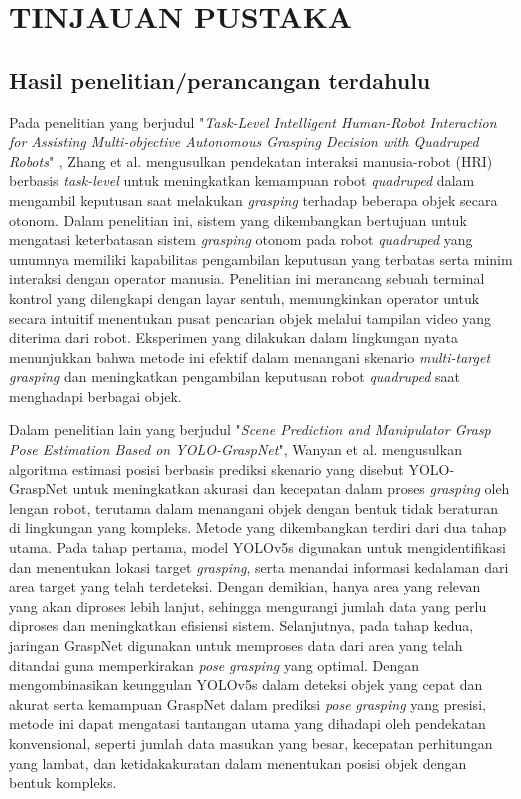 \chapter{TINJAUAN PUSTAKA}

\section{Hasil penelitian/perancangan terdahulu}

Pada penelitian yang berjudul "\emph{Task-Level Intelligent Human-Robot Interaction
for Assisting Multi-objective Autonomous Grasping Decision with Quadruped Robots}"
\parencite{QifanZhang_tlihrifamoagdwqr}, Zhang et al. mengusulkan pendekatan
interaksi manusia-robot (HRI) berbasis \emph{task-level} untuk meningkatkan kemampuan robot \emph{quadruped}
dalam mengambil keputusan saat melakukan \emph{grasping} terhadap beberapa objek secara otonom.
Dalam penelitian ini, sistem yang dikembangkan bertujuan untuk mengatasi keterbatasan sistem
\emph{grasping} otonom pada robot \emph{quadruped} yang umumnya memiliki kapabilitas pengambilan keputusan
yang terbatas serta minim interaksi dengan operator manusia. Penelitian ini merancang sebuah terminal kontrol
yang dilengkapi dengan layar sentuh, memungkinkan operator untuk secara intuitif menentukan
pusat pencarian objek melalui tampilan video yang diterima dari robot.
Eksperimen yang dilakukan dalam lingkungan nyata menunjukkan bahwa metode ini efektif dalam
menangani skenario \emph{multi-target} \emph{grasping} dan meningkatkan pengambilan keputusan robot \emph{quadruped}
saat menghadapi berbagai objek.

Dalam penelitian lain yang berjudul "\emph{Scene Prediction and Manipulator Grasp Pose
Estimation Based on YOLO-GraspNet}"\parencite{LiWanyan_spamgpeboyg}, Wanyan et al. mengusulkan
algoritma estimasi posisi berbasis prediksi skenario yang disebut YOLO-GraspNet untuk
meningkatkan akurasi dan kecepatan dalam proses \emph{grasping} oleh lengan robot, terutama dalam
menangani objek dengan bentuk tidak beraturan di lingkungan yang kompleks.
Metode yang dikembangkan terdiri dari dua tahap utama. Pada tahap pertama, model YOLOv5s
digunakan untuk mengidentifikasi dan menentukan lokasi target \emph{grasping}, serta menandai informasi
kedalaman dari area target yang telah terdeteksi. Dengan demikian, hanya area yang relevan
yang akan diproses lebih lanjut, sehingga mengurangi jumlah data yang perlu diproses dan
meningkatkan efisiensi sistem. Selanjutnya, pada tahap kedua, jaringan GraspNet digunakan
untuk memproses data dari area yang telah ditandai guna memperkirakan \emph{pose} \emph{grasping} yang optimal.
Dengan mengombinasikan keunggulan YOLOv5s dalam deteksi objek yang cepat dan akurat serta
kemampuan GraspNet dalam prediksi \emph{pose} \emph{grasping} yang presisi, metode ini dapat mengatasi
tantangan utama yang dihadapi oleh pendekatan konvensional, seperti jumlah data masukan yang besar,
kecepatan perhitungan yang lambat, dan ketidakakuratan dalam menentukan posisi objek dengan bentuk kompleks.

